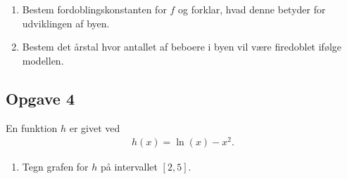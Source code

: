 \documentclass[12pt]{article}
\begin{document}
\begin{enumerate}[label=\roman*)]
	\item Bestem fordoblingskonstanten for $f$ og forklar, hvad denne betyder for udviklingen af byen.
	\item Bestem det årstal hvor antallet af beboere i byen vil være firedoblet ifølge modellen. 
\end{enumerate}
\newpage

\subsection*{Opgave 4}

En funktion $h$ er givet ved
\begin{align*}
	h(x) = \ln(x) - x^2. 
\end{align*}
\begin{enumerate}[label=\roman*)]
	\item Tegn grafen for $h$ på intervallet $[2,5]$.
\end{enumerate}
\end{document}
